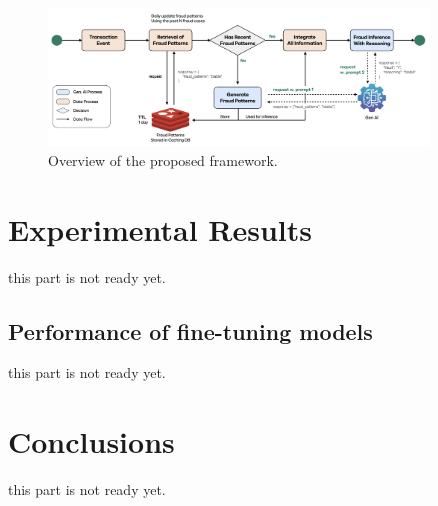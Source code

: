 \documentclass[sigconf]{acmart}
\begin{document}
\begin{figure}[t!]
  \centering
  \includegraphics[width=0.9\textwidth]{figures/fig2_process.png}
  \caption{Overview of the proposed framework.}
\label{fig_process}
\end{figure}












\section{Experimental Results}\label{results}
this part is not ready yet.





\subsection{Performance of fine-tuning models}
this part is not ready yet.









\section{Conclusions}\label{conclusions}
this part is not ready yet.




 
\end{document}
